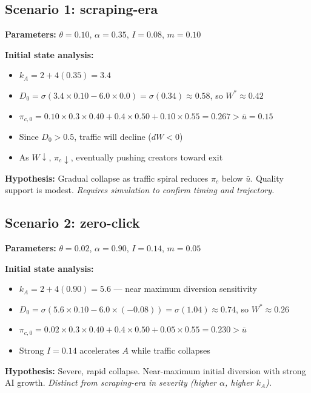 \documentclass[11pt]{article}
\begin{document}
\subsection{Scenario 1: scraping-era}
\textbf{Parameters:} $\theta=0.10$, $\alpha=0.35$, $I=0.08$, $m=0.10$

\textbf{Initial state analysis:}
\begin{itemize}
    \item $k_A = 2 + 4(0.35) = 3.4$
    \item $D_0 = \sigma(3.4 \times 0.10 - 6.0 \times 0.0) = \sigma(0.34) \approx 0.58$, so $W^* \approx 0.42$
    \item $\pi_{c,0} = 0.10 \times 0.3 \times 0.40 + 0.4 \times 0.50 + 0.10 \times 0.55 = 0.267 > \bar{u} = 0.15$
    \item Since $D_0 > 0.5$, traffic will decline ($dW < 0$)
    \item As $W \downarrow$, $\pi_c \downarrow$, eventually pushing creators toward exit
\end{itemize}

\textcolor{myorange}{\textbf{Hypothesis:}} Gradual collapse as traffic spiral reduces $\pi_c$ below $\bar{u}$. Quality support is modest. \textit{Requires simulation to confirm timing and trajectory.}

\subsection{Scenario 2: zero-click}
\textbf{Parameters:} $\theta=0.02$, $\alpha=0.90$, $I=0.14$, $m=0.05$

\textbf{Initial state analysis:}
\begin{itemize}
    \item $k_A = 2 + 4(0.90) = 5.6$ --- near maximum diversion sensitivity
    \item $D_0 = \sigma(5.6 \times 0.10 - 6.0 \times (-0.08)) = \sigma(1.04) \approx 0.74$, so $W^* \approx 0.26$
    \item $\pi_{c,0} = 0.02 \times 0.3 \times 0.40 + 0.4 \times 0.50 + 0.05 \times 0.55 = 0.230 > \bar{u}$
    \item Strong $I=0.14$ accelerates $A$ while traffic collapses
\end{itemize}

\textcolor{myorange}{\textbf{Hypothesis:}} Severe, rapid collapse. Near-maximum initial diversion with strong AI growth. \textit{Distinct from scraping-era in severity (higher $\alpha$, higher $k_A$).}
\end{document}
